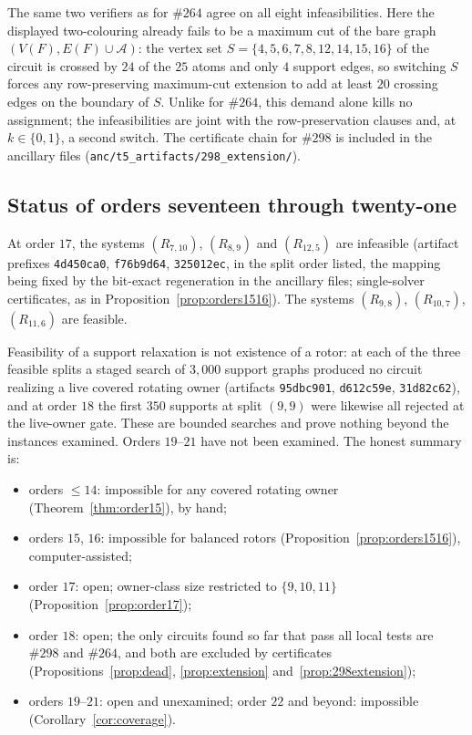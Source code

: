 The same two verifiers as for \(\#264\) agree on all eight
infeasibilities. Here the displayed two-colouring already fails to be
a maximum cut of the bare graph \((V(F),E(F)\cup\mathcal A)\): the
vertex set \(S=\{4,5,6,7,8,12,14,15,16\}\) of the circuit is crossed
by \(24\) of the \(25\) atoms and only \(4\) support edges, so
switching \(S\) forces any row-preserving maximum-cut extension to add
at least \(20\) crossing edges on the boundary of \(S\). Unlike for
\(\#264\), this demand alone kills no assignment; the infeasibilities
are joint with the row-preservation clauses and, at
\(k\in\{0,1\}\), a second switch. The certificate chain for
\(\#298\) is included in the ancillary files
(\texttt{anc/t5\_artifacts/298\_extension/}).

\subsection{Status of orders seventeen through twenty-one}

\begin{proposition}\label{prop:order17}
At order \(17\), the systems \((R_{7,10})\), \((R_{8,9})\) and
\((R_{12,5})\) are infeasible (artifact prefixes \texttt{4d450ca0},
\texttt{f76b9d64}, \texttt{325012ec}, in the split order listed, the
mapping being fixed by the bit-exact regeneration in the ancillary
files; single-solver certificates, as
in Proposition~\ref{prop:orders1516}). The systems \((R_{9,8})\),
\((R_{10,7})\), \((R_{11,6})\) are feasible.
\end{proposition}

Feasibility of a support relaxation is not existence of a rotor: at
each of the three feasible splits a staged search of \(3{,}000\)
support graphs produced no circuit realizing a live covered rotating
owner (artifacts \texttt{95dbc901}, \texttt{d612c59e},
\texttt{31d82c62}), and at order \(18\) the first \(350\) supports at
split \((9,9)\) were likewise all rejected at the live-owner gate.
These are bounded searches and prove nothing beyond the instances
examined. Orders \(19\)--\(21\) have not been examined. The honest
summary is:

\begin{itemize}[leftmargin=2em]
\item orders \(\le14\): impossible for any covered rotating owner
(Theorem~\ref{thm:order15}), by hand;
\item orders \(15\), \(16\): impossible for balanced rotors
(Proposition~\ref{prop:orders1516}), computer-assisted;
\item order \(17\): open; owner-class size restricted to
\(\{9,10,11\}\) (Proposition~\ref{prop:order17});
\item order \(18\): open; the only circuits found so far that pass all
local tests are \(\#298\) and \(\#264\), and both are excluded by
certificates (Propositions~\ref{prop:dead}, \ref{prop:extension}
and~\ref{prop:298extension});
\item orders \(19\)--\(21\): open and unexamined; order \(22\) and
beyond: impossible (Corollary~\ref{cor:coverage}).
\end{itemize}

